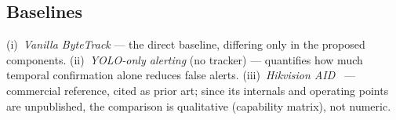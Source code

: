 \subsection{Baselines}
\label{subsec:baselines}

(i)~\emph{Vanilla ByteTrack} --- the direct baseline, differing only in
the proposed components.
(ii)~\emph{YOLO-only alerting} (no tracker) --- quantifies how much
temporal confirmation alone reduces false alerts.
(iii)~\emph{Hikvision AID}~\cite{Hikvision_AID} --- commercial
reference, cited as prior art; since its internals and operating points
are unpublished, the comparison is qualitative (capability matrix), not
numeric.

